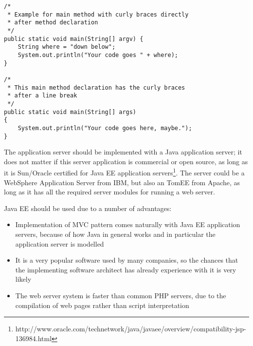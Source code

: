 \documentclass[11pt,a4paper,oneside,svgnames]{report}
\begin{document}

\begin{lstlisting}[caption={Example of method declaration with curly braces in single and new line},label=javaCodeExampleCurlyBraces]
/*
 * Example for main method with curly braces directly 
 * after method declaration
 */
public static void main(String[] argv) {
	String where = "down below";
	System.out.println("Your code goes " + where);
}

/*
 * This main method declaration has the curly braces 
 * after a line break
 */
public static void main(String[] args)
{
	System.out.println("Your code goes here, maybe.");
}
\end{lstlisting}

The application server should be implemented with a Java application server; it does not matter if this server application is commercial or open source, as long as it is Sun/Oracle certified for Java EE application servers\footnote{http://www.oracle.com/technetwork/java/javaee/overview/compatibility-jsp-136984.html}.
The server could be a WebSphere Application Server from IBM, but also an TomEE from Apache, as long as it has all the required server modules for running a web server.

Java EE should be used due to a number of advantages:
\begin{itemize}
	\item Implementation of MVC pattern comes naturally with Java EE application servers, because of how Java in general works and in particular the application server is modelled
	\item It is a very popular software used by many companies, so the chances that the implementing software architect has already experience with it is very likely
	\item The web server system is faster than common PHP servers, due to the compilation of web pages rather than script interpretation
\end{itemize}
\end{document}

